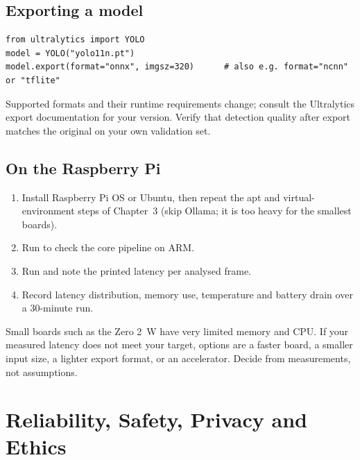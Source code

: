 \section{Exporting a model}
\begin{lstlisting}[style=py]
from ultralytics import YOLO
model = YOLO("yolo11n.pt")
model.export(format="onnx", imgsz=320)      # also e.g. format="ncnn" or "tflite"
\end{lstlisting}
Supported formats and their runtime requirements change; consult the Ultralytics export documentation for your version. Verify that detection quality after export matches the original on your own validation set.

\section{On the Raspberry Pi}
\begin{enumerate}
  \item Install Raspberry Pi OS or Ubuntu, then repeat the apt and virtual-environment steps of Chapter~3 (skip Ollama; it is too heavy for the smallest boards).
  \item Run  to check the core pipeline on ARM.
  \item Run  and note the printed latency per analysed frame.
  \item Record latency distribution, memory use, temperature and battery drain over a 30-minute run.
\end{enumerate}
Small boards such as the Zero 2~W have very limited memory and CPU. If your measured latency does not meet your target, options are a faster board, a smaller input size, a lighter export format, or an accelerator. Decide from measurements, not assumptions.

\chapter{Reliability, Safety, Privacy and Ethics}
